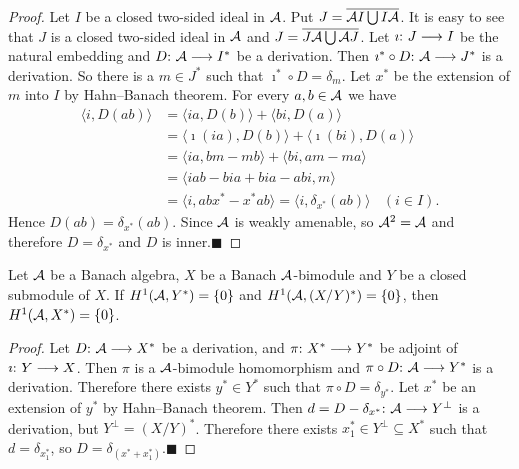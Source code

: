 \documentclass[fleqn]{mat01}
\begin{document}
\begin{proof}
Let $I$ be a closed two-sided ideal in ${\cal A}$. Put
$J=\overline{{\cal A}I \bigcup I{\cal A}}$. It is easy to see that $J$
is a closed two-sided ideal in ${\cal A}$ and $J=\overline{J{\cal A}
\bigcup {\cal A} J}$. Let $\imath\hbox{:}\ J \longrightarrow I$ be the
natural embedding and $D\hbox{:}\ {\cal A} \longrightarrow I^*$ be a
derivation. Then $\imath^*\circ D\hbox{:}\ {\cal A} \longrightarrow J^*$
is a derivation. So there is a $m \in J^*$ such that $\imath^*\circ D
=\delta_m$. Let $x^* $ be the extension of $m$ into $I$ by Hahn--Banach
theorem. For every $a, b \in {\cal A}$ we have
\begin{align*}
\langle i , D(ab) \rangle &= \langle ia , D(b) \rangle + \langle bi , D(a) \rangle\\[.2pc]
&= \langle \imath(ia), D(b) \rangle + \langle \imath(bi ) , D(a) \rangle \\[.2pc]
&= \langle ia, bm - mb \rangle + \langle bi, am - ma \rangle\\[.2pc]
&= \langle iab - bia +bia -abi, m \rangle \\[.2pc]
&= \langle i, abx^* -x^*ab \rangle = \langle i, \delta_{x^*} (ab) \rangle ~~~~(i \in I).
\end{align*}
Hence $D(ab) = \delta_{x^*} (ab)$. Since ${\cal A}$ is weakly
amenable, so ${\cal A}^2 = {\cal A}$ and therefore
$D=\delta_{x^*}$ and $D$ is inner.\hfill $\blacksquare$
\end{proof}

\begin{theor}[\!]
Let $\cal A$ be a Banach algebra{\rm ,} $X$ be a Banach $\cal
A$-bimodule and $Y$ be a closed submodule of $X$. If $H^1({\cal
A},Y^*)=\{0\}$ and $H^1({\cal A},({X/Y})^*)=\{0\}${\rm ,} then
$H^1({\cal A},X^*)=\{0\}$.
\end{theor}

\begin{proof}
Let $D\hbox{:}\ {\cal A}\longrightarrow X^*$ be a derivation, and
$\pi\hbox{:}\ X^*\longrightarrow Y^*$ be adjoint of $\imath\hbox{:}\
Y\longrightarrow X$. Then $\pi$ is a $\cal A$-bimodule homomorphism and
$\pi\circ D\hbox{:}\ {\cal A} \longrightarrow Y^*$ is a derivation.
Therefore there exists $y^*\in Y^*$ such that $\pi\circ D=\delta_{y^*}$.
Let $x^*$ be an extension of $y^*$ by Hahn--Banach theorem. Then
$d=D-\delta_{x^*}\hbox{:}\ {\cal A}\longrightarrow Y^\perp$ is a
derivation, but $Y^\perp=(X/Y)^*$. Therefore there exists $x^*_1\in
Y^\perp\subseteq X^*$ such that $d=\delta_{x^*_1}$, so
$D=\delta_{(x^*+x^*_1)}$.\hfill $\blacksquare$
\end{proof}
\end{document}

